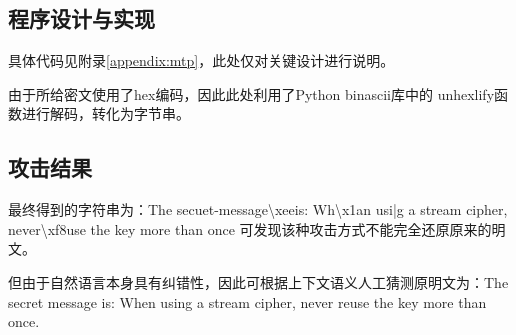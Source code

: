 \subsection{程序设计与实现}

具体代码见附录\ref{appendix:mtp}，此处仅对关键设计进行说明。

由于所给密文使用了hex编码，因此此处利用了Python binascii库中的
unhexlify函数进行解码，转化为字节串。

\subsection{攻击结果}

最终得到的字符串为：The secuet-message\textbackslash xeeis: Wh\textbackslash x1an usi|g a stream cipher, never\textbackslash xf8use the key more than once
可发现该种攻击方式不能完全还原原来的明文。

但由于自然语言本身具有纠错性，因此可根据上下文语义人工猜测原明文为：The secret message is: When using a stream cipher, never reuse the key more than once.